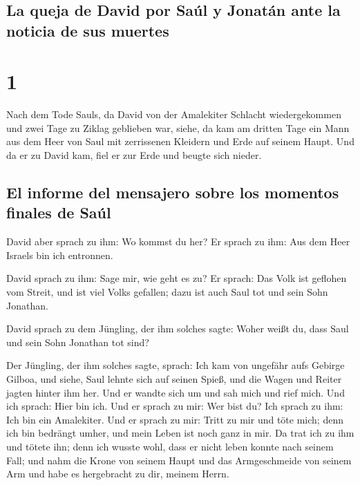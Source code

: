\hypertarget{la-queja-de-david-por-sauxfal-y-jonatuxe1n-ante-la-noticia-de-sus-muertes}{%
\subsection{La queja de David por Saúl y Jonatán ante la noticia de sus
muertes}\label{la-queja-de-david-por-sauxfal-y-jonatuxe1n-ante-la-noticia-de-sus-muertes}}

\hypertarget{section}{%
\section{1}\label{section}}

 Nach dem Tode Sauls, da David von der Amalekiter Schlacht
wiedergekommen und zwei Tage zu Ziklag geblieben war, 
siehe, da kam am dritten Tage ein Mann aus dem Heer von Saul mit
zerrissenen Kleidern und Erde auf seinem Haupt. Und da er zu David kam,
fiel er zur Erde und beugte sich nieder.

\hypertarget{el-informe-del-mensajero-sobre-los-momentos-finales-de-sauxfal}{%
\subsection{El informe del mensajero sobre los momentos finales de
Saúl}\label{el-informe-del-mensajero-sobre-los-momentos-finales-de-sauxfal}}

 David aber sprach zu ihm: Wo kommst du her? Er sprach zu
ihm: Aus dem Heer Israels bin ich entronnen.

 David sprach zu ihm: Sage mir, wie geht es zu? Er sprach:
Das Volk ist geflohen vom Streit, und ist viel Volks gefallen; dazu ist
auch Saul tot und sein Sohn Jonathan.

 David sprach zu dem Jüngling, der ihm solches sagte:
Woher weißt du, dass Saul und sein Sohn Jonathan tot sind?

 Der Jüngling, der ihm solches sagte, sprach: Ich kam von
ungefähr aufs Gebirge Gilboa, und siehe, Saul lehnte sich auf seinen
Spieß, und die Wagen und Reiter jagten hinter ihm her. 
Und er wandte sich um und sah mich und rief mich. Und ich sprach: Hier
bin ich.  Und er sprach zu mir: Wer bist du? Ich sprach zu
ihm: Ich bin ein Amalekiter.  Und er sprach zu mir: Tritt
zu mir und töte mich; denn ich bin bedrängt umher, und mein Leben ist
noch ganz in mir.  Da trat ich zu ihm und tötete ihn;
denn ich wusste wohl, dass er nicht leben konnte nach seinem Fall; und
nahm die Krone von seinem Haupt und das Armgeschmeide von seinem Arm und
habe es hergebracht zu dir, meinem Herrn.


